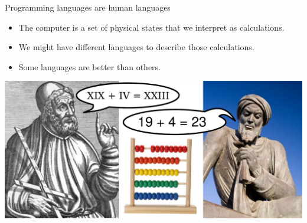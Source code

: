 \documentclass[aspectratio=169]{beamer}
\begin{document}
\begin{frame}{Programming languages are human languages}
\vspace{0.25 cm}
\begin{itemize}
\item The computer is a set of physical states that we interpret as calculations.
\item We might have different languages to describe those calculations.
\item Some languages are better than others.
\end{itemize}

\begin{center}
\includegraphics[width=0.9\linewidth]{abacus_ptolemy_al-khwarizmi.pdf}
\end{center}
\end{frame}
\end{document}
